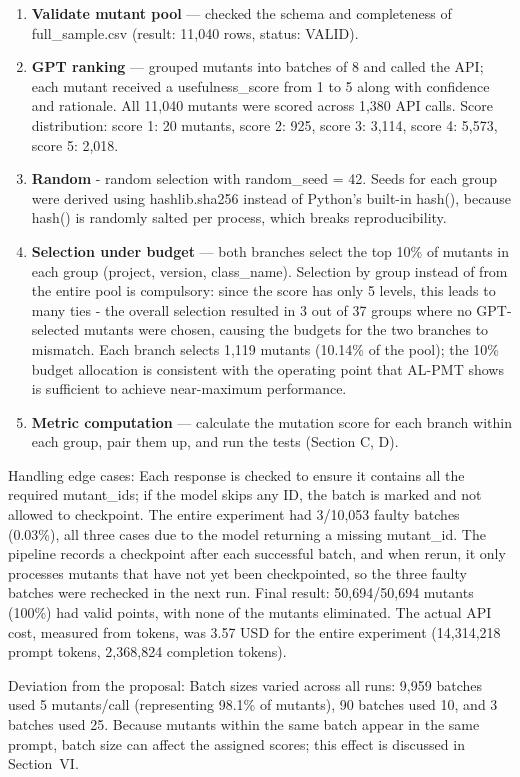 \begin{enumerate}
\item \textbf{Validate mutant pool} — checked the schema and completeness of full\_sample.csv (result: 11,040 rows, status: VALID).
\item \textbf{GPT ranking} — grouped mutants into batches of 8 and called the API; each mutant received a usefulness\_score from 1 to 5 along with confidence and rationale. All 11,040 mutants were scored across 1,380 API calls. Score distribution: score 1: 20 mutants, score 2: 925, score 3: 3,114, score 4: 5,573, score 5: 2,018.
\item \textbf{Random} - random selection with random\_seed = 42. Seeds for each group were derived using hashlib.sha256 instead of Python's built-in hash(), because hash() is randomly salted per process, which breaks reproducibility.
\item \textbf{Selection under budget} — both branches select the top 10\% of mutants in each group (project, version, class\_name). Selection by group instead of from the entire pool is compulsory: since the score has only 5 levels, this leads to many ties - the overall selection resulted in 3 out of 37 groups where no GPT-selected mutants were chosen, causing the budgets for the two branches to mismatch. Each branch selects 1,119 mutants (10.14\% of the pool); the 10\% budget allocation is consistent with the operating point that AL-PMT shows is sufficient to achieve near-maximum performance.
\item \textbf{Metric computation} — calculate the mutation score for each branch within each group, pair them up, and run the tests (Section C, D).
\end{enumerate}

Handling edge cases: Each response is checked to ensure it contains all the required mutant\_ids; if the model skips any ID, the batch is marked and not allowed to checkpoint. The entire experiment had 3/10,053 faulty batches (0.03\%), all three cases due to the model returning a missing mutant\_id. The pipeline records a checkpoint after each successful batch, and when rerun, it only processes mutants that have not yet been checkpointed, so the three faulty batches were rechecked in the next run. Final result: 50,694/50,694 mutants (100\%) had valid points, with none of the mutants eliminated. The actual API cost, measured from tokens, was 3.57 USD for the entire experiment (14,314,218 prompt tokens, 2,368,824 completion tokens).

Deviation from the proposal: Batch sizes varied across all runs: 9,959 batches used 5 mutants/call (representing 98.1\% of mutants), 90 batches used 10, and 3 batches used 25. Because mutants within the same batch appear in the same prompt, batch size can affect the assigned scores; this effect is discussed in Section~VI.

